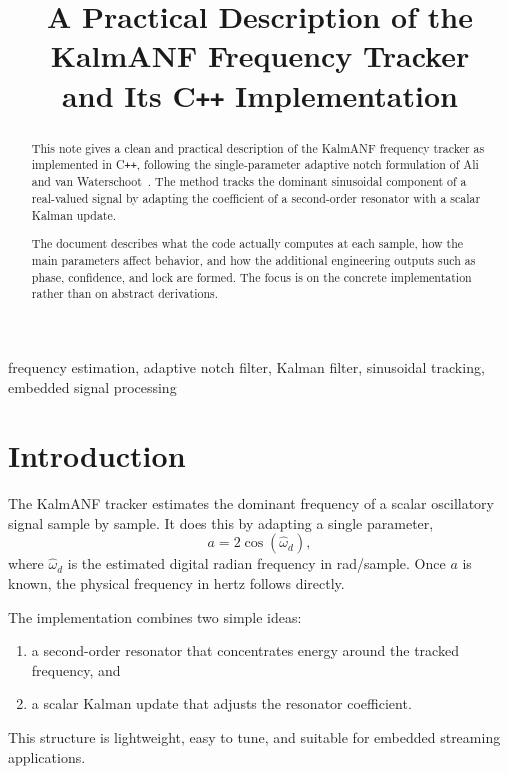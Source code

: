 \documentclass[conference]{IEEEtran}
\title{A Practical Description of the KalmANF Frequency Tracker\\
and Its C\texttt{++} Implementation}
\author{%
  \IEEEauthorblockN{Mikhail S.\ Grushinskiy}
  \IEEEauthorblockA{Independent Researcher\\
  Bareboat Necessities Project\\
  \texttt{mgrouch@users.github.com}}
}
\begin{document}
\maketitle

\begin{abstract}
This note gives a clean and practical description of the KalmANF frequency
tracker as implemented in C\texttt{++}, following the single-parameter
adaptive notch formulation of Ali and van Waterschoot~\cite{AliWaterschoot2023}.
The method tracks the dominant sinusoidal component of a real-valued signal by
adapting the coefficient of a second-order resonator with a scalar Kalman
update.

The document describes what the code actually computes at each sample, how the
main parameters affect behavior, and how the additional engineering outputs
such as phase, confidence, and lock are formed. The focus is on the concrete
implementation rather than on abstract derivations.
\end{abstract}

\begin{IEEEkeywords}
frequency estimation, adaptive notch filter, Kalman filter, sinusoidal
tracking, embedded signal processing
\end{IEEEkeywords}

\section{Introduction}

The KalmANF tracker estimates the dominant frequency of a scalar oscillatory
signal sample by sample. It does this by adapting a single parameter,
\begin{equation}
  a = 2\cos(\hat\omega_d),
\end{equation}
where $\hat\omega_d$ is the estimated digital radian frequency in
rad/sample. Once $a$ is known, the physical frequency in hertz follows
directly.

The implementation combines two simple ideas:
\begin{enumerate}[leftmargin=1.5em]
  \item a second-order resonator that concentrates energy around the tracked
        frequency, and
  \item a scalar Kalman update that adjusts the resonator coefficient.
\end{enumerate}

This structure is lightweight, easy to tune, and suitable for embedded
streaming applications.
\end{document}

